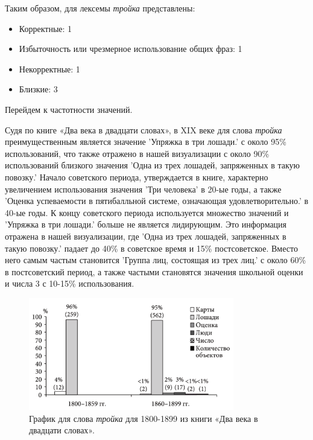 \documentclass[LI,VKR]{HSEUniversity}
\begin{document}
Таким образом, для лексемы \textit{тройка} представлены:

\begin{itemize}
    \item Корректные: 1
    \item Избыточность или чрезмерное использование общих фраз: 1
    \item Некорректные: 1
    \item Близкие: 3
\end{itemize}

Перейдем к частотности значений.

Судя по книге «Два века в двадцати словах», в XIX веке для слова \textit{тройка}
преимущественным является значение ’Упряжка в три лошади.’ с около 95\% использований,
что также отражено в нашей визуализации с около 90\% использований близкого значения
’Одна из трех лошадей, запряженных в такую повозку.’
Начало советского периода, утверждается в книге, характерно увеличением использования значения
’Три человека’ в 20-ые годы, а также ’Оценка успеваемости в пятибалльной системе, означающая удовлетворительно.’
в 40-ые годы.
К концу советского периода используется множество значений и
’Упряжка в три лошади.’ больше не является
лидирующим.
Это информация отражена в нашей визуализации, где ’Одна из трех лошадей, запряженных в такую повозку.’
падает до 40\% в советское время и 15\% постсоветское.
Вместо него самым частым становится ’Группа лиц, состоящая из трех лиц.’ с около 60\%
в постсоветский период, а также частыми становятся значения школьной оценки
и числа 3 с 10-15\% использования.

\noindent %
\begin{figure}[H]
    \centering %
    \includegraphics[width=0.8\textwidth]{img/book/trojka/1800-1899}
    \caption{График для слова \textit{тройка} для 1800-1899 из книги «Два века в двадцати словах».}
\end{figure}
\end{document}
